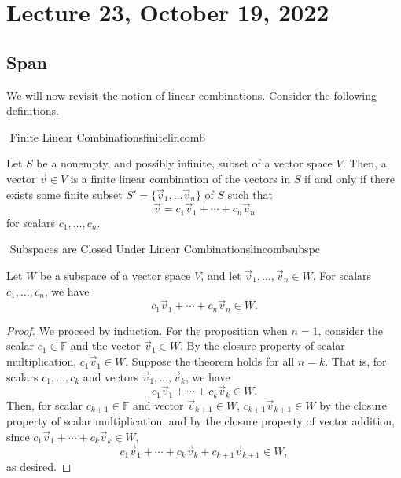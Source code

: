         \pagebreak

\section{Lecture 23, October 19, 2022}

    \subsection{Span}
        
        We will now revisit the notion of linear combinations. Consider the following definitions.
        \begin{definition}{\Stop\,\,Finite Linear Combinations}{finitelincomb}

            Let \(S\) be a nonempty, and possibly infinite, subset of a vector space \(V\). Then, a vector \(\vec{v}\in V\) is a finite linear combination of the vectors in \(S\) if and only if there exists some finite subset \(S'=\{\vec{v}_1,\ldots\vec{v}_n\}\) of \(S\) such that
            \begin{equation*}
                \vec{v}=c_1\vec{v}_1+\cdots+c_n\vec{v}_n
            \end{equation*}
            for scalars \(c_1,\ldots,c_n\).
            
        \end{definition}
        \begin{theorem}{\Stop\,\,Subspaces are Closed Under Linear Combinations}{lincombsubspc}

            Let \(W\) be a subspace of a vector space \(V\), and let \(\vec{v}_1,\ldots,\vec{v}_n\in W\). For scalars \(c_1,\ldots,c_n\), we have
            \begin{equation*}
                c_1\vec{v}_1+\cdots+c_n\vec{v}_n\in W.
            \end{equation*}
            \begin{proof}
                We proceed by induction. For the proposition when \(n=1\), consider the scalar \(c_1\in\mathbb{F}\) and the vector \(\vec{v}_1\in W\). By the closure property of scalar multiplication, \(c_1\vec{v}_1\in W\). Suppose the theorem holds for all \(n=k\). That is, for scalars \(c_1,\ldots,c_k\) and vectors \(\vec{v}_1,\ldots,\vec{v}_k\), we have
                \begin{equation*}
                    c_1\vec{v}_1+\cdots+c_k\vec{v}_k\in W.
                \end{equation*}
                Then, for scalar \(c_{k+1}\in\mathbb{F}\) and vector \(\vec{v}_{k+1}\in W\), \(c_{k+1}\vec{v}_{k+1}\in W\) by the closure property of scalar multiplication, and by the closure property of vector addition,
                since \( c_1\vec{v}_1+\cdots+c_k\vec{v}_k\in W\), 
                \begin{equation*}
                    c_1\vec{v}_1+\cdots+c_k\vec{v}_k+c_{k+1}\vec{v}_{k+1}\in W,
                \end{equation*}
                as desired.
            \end{proof}
        \end{theorem}

